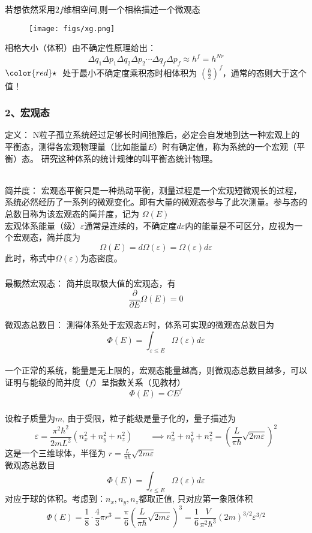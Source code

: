 \begin{frame}
  \frametitle{}
  若想依然采用$2f$维相空间,则一个相格描述一个微观态\\
  \begin{figure}[htbp]
    \centering
    \texttt{[image: figs/xg.png]}
  \end{figure}
  相格大小（体积）由不确定性原理给出：
  \[ \Delta q_1 \Delta p_1 \Delta q_2 \Delta p_2 \cdots \Delta q_f \Delta p_f \approx h^f = h^{Nr}\]
  ${\color{red}\star}~$ 处于最小不确定度乘积态时相体积为 $\left(\frac{\hbar}{2}\right)^f$，通常的态则大于这个值！
\end{frame} 

\begin{frame}
  \frametitle{ 2、宏观态}
  \alert{定义：} N粒子孤立系统经过足够长时间弛豫后，必定会自发地到达一种宏观上的平衡态，测得各宏观物理量（比如能量$E$）时有确定值，称为系统的一个宏观（平衡）态。 研究这种体系的统计规律的叫平衡态统计物理。

  ~~\\ 
  \alert{简并度：} 宏观态平衡只是一种热动平衡，测量过程是一个宏观短微观长的过程，系统必然经历了一系列的微观变化。即有大量的微观态参与了此次测量。参与态的总数目称为该宏观态的简并度，记为
  $\Omega(E)$\\
  宏观体系能量（级）$\varepsilon$通常是连续的，不确定度$d \varepsilon$内的能量是不可区分，应视为一个宏观态，简并度为 
  \[\Omega(E) = d\Omega(\varepsilon) = \Omega(\varepsilon) d \varepsilon \]
  此时，称式中$\Omega(\varepsilon)$为态密度。
\end{frame} 

\begin{frame}
  \frametitle{}
  \alert{最概然宏观态：} 简并度取极大值的宏观态，有
  \[\frac{\partial }{\partial E }\Omega(E) =0\]
  ~~\\ 
  \alert{微观态总数目：} 测得体系处于宏观态$E$时，体系可实现的微观态总数目为
  \[\Phi(E) = \int_{\varepsilon \le E} \Omega(\varepsilon) d \varepsilon\]
  ~~\\ 
  一个正常的系统，能量是无上限的，宏观态能量越高，则微观态总数目越多，可以证明与能级的简并度（$f$）呈指数关系（见教材）
  \[\Phi(E) =C E^f\]
\end{frame} 
 
\begin{frame}
  \frametitle{}
  \解 设粒子质量为$m$, 由于受限，粒子能级是量子化的，量子描述为
  \[ \varepsilon = \frac{\pi ^2 \hbar^2}{2m L^2}(n_x^2 +n_y^2 + n_z^2 )\qquad \implies n_x^2 +n_y^2 + n_z^2 = \left( \frac{L}{\pi \hbar} \sqrt{2m \varepsilon}  \right)^2 \]
  这是一个三维球体，半径为 $ r =  \frac{L}{\pi \hbar} \sqrt{2m \varepsilon} $ \\
  微观态总数目
  \[\Phi(E) = \int_{\varepsilon \le E} \Omega(\varepsilon) d \varepsilon\]
  对应于球的体积。考虑到：$n_x, n_y, n_z$都取正值, 只对应第一象限体积
  \[\Phi(E) = \frac{1}{8} \cdot\frac{4}{3} \pi r^3 = \frac{\pi}{6} \left( \frac{L}{\pi \hbar} \sqrt{2m \varepsilon}  \right)^3 = \frac{1}{6} \frac{V}{\pi ^2 \hbar^3} (2m)^{3/2} \varepsilon^{3/2} \]
\end{frame} 

